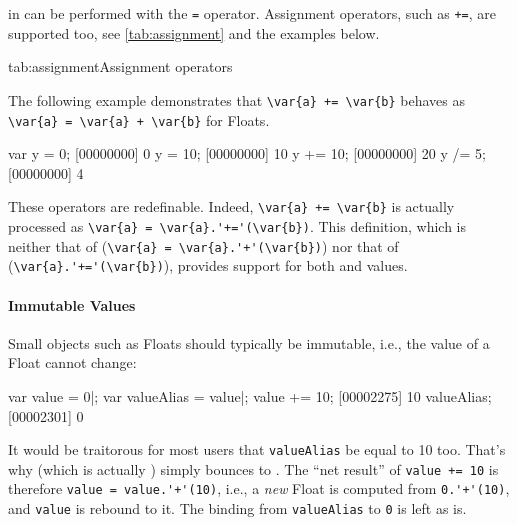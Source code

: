 
 in \us can be performed with the \lstinline|=| operator.
Assignment operators, such as \lstinline|+=|, are supported too, see
\autoref{tab:assignment} and the examples below.


\begin{operatorTable}{tab:assignment}{Assignment operators}
  \operatorass[\footnotemark]\\
  \operatorsiass
\end{operatorTable}


The following example demonstrates that \lstinline|\var{a} += \var{b}|
behaves as \lstinline|\var{a} = \var{a} + \var{b}| for Floats.
\begin{urbiscript}
var y = 0;
[00000000] 0
y = 10;
[00000000] 10
y += 10;
[00000000] 20
y /= 5;
[00000000] 4
\end{urbiscript}

These operators are redefinable.  Indeed, \lstinline|\var{a} += \var{b}| is
actually processed as \lstinline|\var{a} = \var{a}.'+='(\var{b})|.  This
definition, which is neither that of \langC
(\lstinline|\var{a} = \var{a}.'+'(\var{b})|) nor that of \Cxx
(\lstinline|\var{a}.'+='(\var{b})|), provides support for both
 and  values.

\paragraph{Immutable Values}
Small objects such as Floats should typically be immutable, i.e., the value
of a Float cannot change:

\begin{urbiscript}
var value = 0|;
var valueAlias = value|;
value += 10;
[00002275] 10
valueAlias;
[00002301] 0
\end{urbiscript}

It would be traitorous for most users that \lstinline{valueAlias} be equal
to 10 too.  That's why  (which is actually
) simply bounces to .  The ``net
result'' of \lstinline|value += 10| is therefore
\lstinline|value = value.'+'(10)|, i.e., a \emph{new} Float is computed from
\lstinline|0.'+'(10)|, and \lstinline{value} is rebound to it.  The binding
from \lstinline{valueAlias} to \lstinline|0| is left as is.

